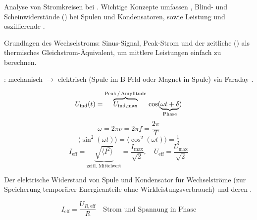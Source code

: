 
\ZSFmanualColumnBreak
{}

\begin{runintext}
Analyse von Stromkreisen bei . Wichtige Konzepte umfassen , Blind- und Scheinwiderstände () bei Spulen und Kondensatoren, sowie Leistung und oszillierende .
\end{runintext}

\begin{runintext}
Grundlagen des Wechselstroms: Sinus-Signal, Peak-Strom und der zeitliche  () als thermisches Gleichstrom-Äquivalent, um mittlere Leistungen einfach zu berechnen.
\end{runintext}
\begin{runintext}
: mechanisch $\to$ elektrisch (Spule im B-Feld oder Magnet in Spule) via Faraday .
\end{runintext}


\begin{formulabox}
\[ U_{\mathrm{ind}}(t) = \overbrace{U_{\mathrm{ind},\mathrm{max}}}^{\text{Peak\,/\,Amplitude}}\,\cos(\underbrace{\omega t + \delta}_{\text{Phase}}) \]
\[ \omega = 2\pi\nu = 2\pi f = \frac{2\pi}{T} \]
\formulasep
\[ \langle \sin^2(\omega t)\rangle = \langle \cos^2(\omega t)\rangle = \tfrac{1}{2} \]
\formulasep
\[ I_{\mathrm{eff}} = \underbrace{\sqrt{\langle I^2\rangle}}_{\text{zeitl. Mittelwert}} = \frac{I_{\max}}{\sqrt{2}}, \quad U_{\mathrm{eff}} = \frac{U_{\max}}{\sqrt{2}} \]
\end{formulabox}

\begin{runintext}
Der elektrische Widerstand von Spule und Kondensator für Wechselströme (zur Speicherung temporärer Energieanteile ohne Wirkleistungsverbrauch) und deren .
\end{runintext}
\begin{formulabox}
\[ I_{\mathrm{eff}} = \frac{U_{R,\mathrm{eff}}}{R} \quad \text{Strom und Spannung in Phase} \]
\end{formulabox}

